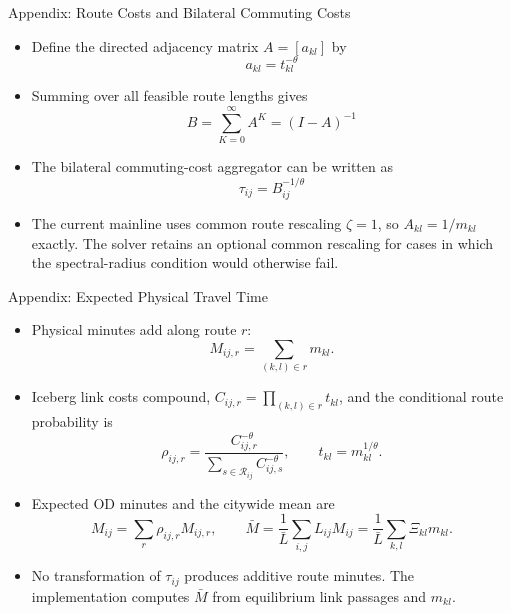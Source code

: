 \documentclass[11pt,aspectratio=169]{beamer}
\newcommand{\navback}[1]{\par\vspace{0.35em}\noindent\hfill\hyperlink{#1}{\beamerreturnbutton{back}}}
\begin{document}
\begin{frame}[label=approute]{Appendix: Route Costs and Bilateral Commuting Costs}
\begin{itemize}\small
  \item Define the directed adjacency matrix $A=[a_{kl}]$ by
  \vspace{-0.5em}\begin{equation}
    a_{kl} = t_{kl}^{-\theta}
  \end{equation}
  \item Summing over all feasible route lengths gives
  \vspace{-0.5em}\begin{equation}
    B = \sum_{K=0}^{\infty}A^K = (I-A)^{-1}
  \end{equation}
  \item The bilateral commuting-cost aggregator can be written as
  \vspace{-0.5em}\begin{equation}\label{eq:inverse}
    \tau_{ij} = B_{ij}^{-1/\theta}
  \end{equation}
  \vspace{-0.5em}
  \item The current mainline uses common route rescaling $\zeta=1$, so $A_{kl}=1/m_{kl}$ exactly. The solver retains an optional common rescaling for cases in which the spectral-radius condition would otherwise fail.
\end{itemize}
\navback{bilateral}
\end{frame}

\begin{frame}[label=appphysicaltime]{Appendix: Expected Physical Travel Time}
\scriptsize
\begin{itemize}\setlength\itemsep{0.45em}
  \item Physical minutes add along route $r$:
  \vspace{-0.35em}
  \[
    M_{ij,r}=\sum_{(k,l)\in r}m_{kl}.
  \]
  \vspace{-0.75em}
  \item Iceberg link costs compound, $C_{ij,r}=\prod_{(k,l)\in r}t_{kl}$, and the conditional route probability is
  \vspace{-0.35em}
  \[
    \rho_{ij,r}=\frac{C_{ij,r}^{-\theta}}{\sum_{s\in\mathcal R_{ij}}C_{ij,s}^{-\theta}},
    \qquad t_{kl}=m_{kl}^{1/\theta}.
  \]
  \vspace{-0.75em}
  \item Expected OD minutes and the citywide mean are
  \vspace{-0.35em}
  \[
    M_{ij}=\sum_r\rho_{ij,r}M_{ij,r},
    \qquad
    \bar M=\frac{1}{\bar L}\sum_{i,j}L_{ij}M_{ij}
    =\frac{1}{\bar L}\sum_{k,l}\Xi_{kl}m_{kl}.
  \]
  \vspace{-0.75em}
  \item No transformation of $\tau_{ij}$ produces additive route minutes. The implementation computes $\bar M$ from equilibrium link passages and $m_{kl}$.
\end{itemize}
\navback{result2}
\end{frame}
\end{document}
